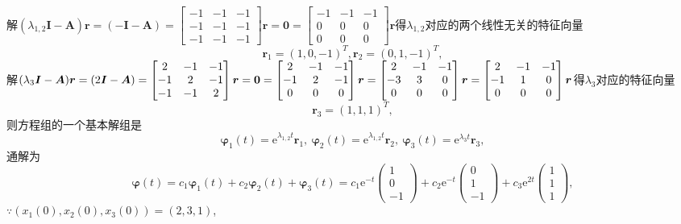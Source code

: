 \documentclass[12pt,UTF8]{ctexart}
\newcommand{\me}[0]{\mathrm e}
\begin{document}
\begin{enumerate}
解$(\lambda_{1,2}\bm I-\bm A)\bm r=(-\bm I-\bm A)=\begin{bmatrix}-1&-1&-1\\-1&-1&-1\\-1&-1&-1\end{bmatrix}\bm r=\bm0=\begin{bmatrix}-1&-1&-1\\0&0&0\\0&0&0\end{bmatrix}\bm r$得$\lambda_{1,2}$对应的两个线性无关的特征向量
\[\bm r_1=(1,0,-1)^T,\bm r_2=(0,1,-1)^T,\]
解$(\lambda_3\bm I-\bm A)\bm r=(2\bm I-\bm A)=\begin{bmatrix}2&-1&-1\\-1&2&-1\\-1&-1&2\end{bmatrix}\bm r=\bm0=\begin{bmatrix}2&-1&-1\\-1&2&-1\\0&0&0\end{bmatrix}\bm r=\begin{bmatrix}2&-1&-1\\-3&3&0\\0&0&0\end{bmatrix}\bm r\\
=\begin{bmatrix}2&-1&-1\\-1&1&0\\0&0&0\end{bmatrix}\bm r$得$\lambda_3$对应的特征向量
\[\bm r_3=(1,1,1)^T,\]
则方程组的一个基本解组是
\[\bm\varphi_1(t)=\me^{\lambda_{1,2}t}\bm r_1,\ \bm\varphi_2(t)=\me^{\lambda_{1,2}t}\bm r_2,\ \bm\varphi_3(t)=\me^{\lambda_3t}\bm r_3,\]
通解为
\[\bm\varphi(t)=c_1\bm\varphi_1(t)+c_2\bm\varphi_2(t)+\bm\varphi_3(t)=c_1\me^{-t}\begin{pmatrix}1\\0\\-1\end{pmatrix}+c_2\me^{-t}\begin{pmatrix}0\\1\\-1\end{pmatrix}+c_3\me^{2t}\begin{pmatrix}1\\1\\1\end{pmatrix},\]
$\because(x_1(0),x_2(0),x_3(0))=(2,3,1)$,


\end{enumerate}
\end{document}
